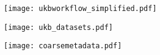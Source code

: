 \begin{figure}
	\centering
	\texttt{[image: ukbworkflow\_simplified.pdf]}
	\caption[]{}
	\label{fig:ngram}
\end{figure}

\begin{figure}
	\centering
	\texttt{[image: ukb\_datasets.pdf]}
	\caption[]{}
	\label{fig:ngram}
\end{figure}

\begin{figure}
	\centering
	\texttt{[image: coarsemetadata.pdf]}
	\caption[]{}
	\label{fig:ngram}
\end{figure}



\pagebreak